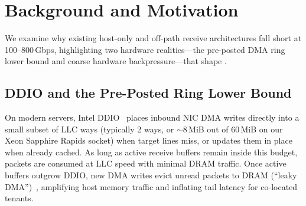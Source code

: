 \section{Background and Motivation}
\label{sec:background}

We examine why existing host-only and off-path receive architectures fall short
at 100--800\,Gbps, highlighting two hardware realities---the pre-posted DMA
ring lower bound and coarse hardware backpressure---that shape \sys{}.

\subsection{DDIO and the Pre-Posted Ring Lower Bound}
\label{sec:bg-ddio}

On modern servers, Intel DDIO~\cite{intelddio,farshin2020ddio} places inbound
NIC DMA writes directly into a small subset of LLC ways (typically 2 ways, or
$\sim$8\,MiB out of 60\,MiB on our Xeon Sapphire Rapids socket) when target
lines miss, or updates them in place when already cached. As long as active
receive buffers remain inside this budget, packets are consumed at LLC speed
with minimal DRAM traffic. Once active buffers outgrow DDIO, new DMA writes
evict unread packets to DRAM (``leaky DMA'')~\cite{tootoonchian2018resq,farshin2020ddio},
amplifying host memory traffic and inflating tail latency for co-located
tenants.

